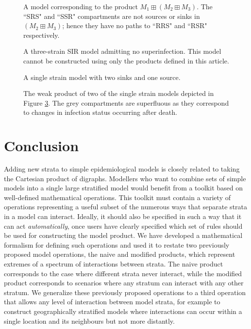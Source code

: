 \begin{figure}
    \centering
    
    \caption{A model corresponding to the product $M_1\boxplus (M_2\boxplus M_3)$. The ``SRS" and ``SSR" compartments are not sources or sinks in $(M_2 \boxplus M_3)$; hence they have no paths to ``RRS" and ``RSR" respectively.}
    \label{fig:wp_nonasoc}
\end{figure}

\begin{figure}
    \centering
    
    \caption{A three-strain SIR model admitting no superinfection. This model cannot be constructed using only the products defined in this article.}
    \label{fig:ms_ns_3d}
\end{figure}

\begin{figure}
    \centering
    
    \caption{A single strain model with two sinks and one source.}
    \label{fig:msms}
\end{figure}

\begin{figure}
    \centering
    
    \caption{The weak product of two of the single strain models depicted in Figure \ref{fig:msms}. The grey compartments are superfluous as they correspond to changes in infection status occurring after death.}
    \label{fig:msms2}
\end{figure}

\FloatBarrier
\section{Conclusion}\label{conc}

Adding new strata to simple epidemiological models is closely related to taking the Cartesian product of digraphs. Modellers who want to combine sets of simple models into a single large stratified model would benefit from a toolkit based on well-defined mathematical operations. This toolkit must contain a variety of operations representing a useful subset of the numerous ways that separate strata in a model can interact. Ideally, it should also be specified in such a way that it can act \emph{automatically}, once users have clearly specified which set of rules should be used for constructing the model product. We have developed a mathematical formalism for defining such operations and used it to restate two previously proposed model operations, the naive and modified products, which represent extremes of a spectrum of interactions between strata. The naive product corresponds to the case where different strata never interact, while the modified product corresponds to scenarios where any stratum can interact with any other stratum. We generalize these previously proposed operations to a third operation that allows any level of interaction between model strata, for example to construct geographically stratified models where interactions can occur within a single location and its neighbours but not more distantly.

